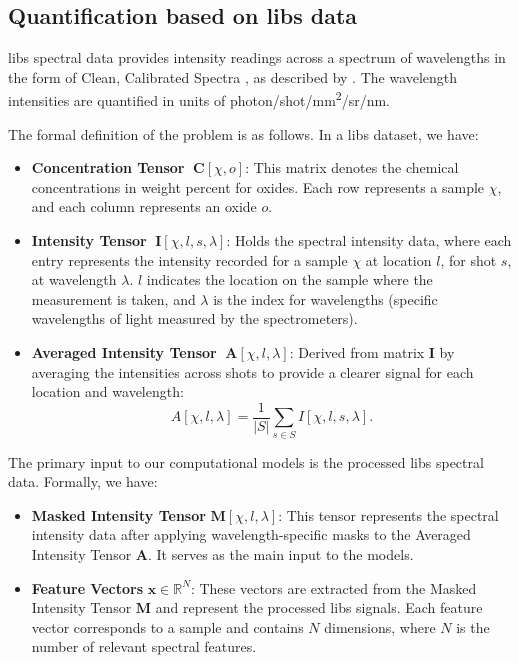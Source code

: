 \subsection{Quantification based on \gls{libs} data}
\gls{libs} spectral data provides intensity readings across a spectrum of wavelengths in the form of Clean, Calibrated Spectra \cite{andersonImprovedAccuracyQuantitative2017}, as described by \citet{wiensPreflightCalibrationInitial2013}.
The wavelength intensities are quantified in units of photon/shot/mm\textsuperscript{2}/sr/nm.

The formal definition of the problem is as follows.
In a \gls{libs} dataset, we have:
\begin{itemize}[topsep=0pt]
    \item \textbf{Concentration Tensor} $\;\mathbf{C}[\chi, o]$: This matrix denotes the chemical concentrations in weight percent for oxides. Each row represents a sample $\chi$, and each column represents an oxide $o$.
    \label{matrix:concentration}

    \item \textbf{Intensity Tensor} $\;\mathbf{I}[\chi, l, s, \lambda]$: Holds the spectral intensity data, where each entry represents the intensity recorded for a sample $\chi$ at location $l$, for shot $s$, at wavelength $\lambda$. $l$ indicates the location on the sample where the measurement is taken, and $\lambda$ is the index for wavelengths (specific wavelengths of light measured by the spectrometers).
    \label{matrix:intensity}

    \item \textbf{Averaged Intensity Tensor} $\;\mathbf{A}[\chi, l, \lambda]$: Derived from matrix $\mathbf{I}$ by averaging the intensities across shots to provide a clearer signal for each location and wavelength:
    \[
    A[\chi, l, \lambda] = \frac{1}{|S|} \sum_{s \in S} I[\chi, l, s, \lambda].
    \]
    \label{matrix:averaged_intensity}
\end{itemize}

The primary input to our computational models is the processed \gls{libs} spectral data.
Formally, we have:
\begin{itemize}
    \item \textbf{Masked Intensity Tensor} $\mathbf{M}[\chi, l, \lambda]$: This tensor represents the spectral intensity data after applying wavelength-specific masks to the Averaged Intensity Tensor $\mathbf{A}$. It serves as the main input to the models.
    \item \textbf{Feature Vectors} $\mathbf{x} \in \mathbb{R}^N$: These vectors are extracted from the Masked Intensity Tensor $\mathbf{M}$ and represent the processed \gls{libs} signals. Each feature vector corresponds to a sample and contains $N$ dimensions, where $N$ is the number of relevant spectral features.
\end{itemize}

